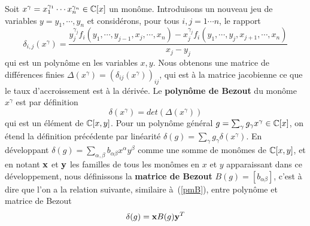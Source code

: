 \documentclass{standalone}
\begin{document}
\begin{defn}
Soit $x^\gamma = x_1^{\gamma_1}\cdots x_n^{\gamma_n} \in \mathbb{C}[x]$ un monôme.
Introduisons un nouveau jeu de variables $y = y_1,\cdots, y_n$ et considérons, pour tous $i, j = 1\cdots n$, le rapport
\begin{equation}
\label{finite_diff}
\delta_{i,j}(x^\gamma) = \dfrac{y_j^{\gamma_j}f_i(y_1,\cdots, y_{j-1},x_j,\cdots,x_n) - x_j^{\gamma_j}f_i(y_1,\cdots,y_j,x_{j+1},\cdots,x_n)}{x_j - y_j}
\end{equation}
qui est un polynôme en les variables $x, y$. Nous obtenons une matrice de différences finies $\Delta(x^\gamma) = (\delta_{ij}(x^\gamma))_{ij}$, qui est à la matrice jacobienne ce que le taux d'accroissement est à la dérivée.
Le {\bf polynôme de Bezout} du monôme $x^\gamma$ est par définition
\begin{equation}
	\delta(x^\gamma) = det(\Delta(x^\gamma))
\end{equation}
qui est un élément de $\mathbb{C}[x, y]$. Pour un polynôme général $g = \sum_\gamma g_\gamma x^\gamma \in \mathbb{C}[x]$, on étend la définition précédente par linéarité $\delta(g) = \sum_\gamma g_\gamma \delta(x^\gamma)$.
En développant $\delta(g) = \sum_{\alpha,\beta} b_{\alpha\beta} x^\alpha y^\beta$ comme une somme de monômes de $\mathbb{C}[x, y]$, et en notant $\bold{x}$ et $\bold{y}$ les familles de tous les monômes en $x$ et $y$ apparaissant dans ce développement, nous définissons la {\bf matrice de Bezout} $B(g) = [b_{\alpha\beta}]$, c'est à dire que l'on a la relation suivante, similaire à~(\ref{pmB}), entre polynôme et matrice de Bezout
\begin{equation}
	\delta(g) = \bold{x} B(g) \bold{y}^T
\end{equation}
\end{defn}
\end{document}
